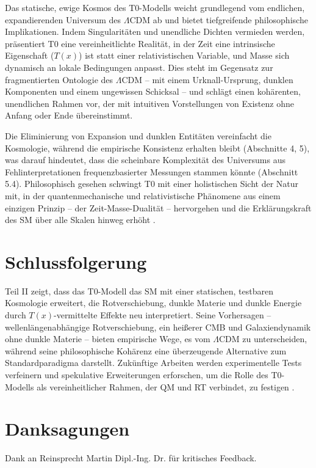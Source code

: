 \documentclass[12pt,a4paper]{article}
\newenvironment{acknowledgments}
{\section*{Danksagungen}}
{\vspace{1em}}
\newcommand{\Tfield}{T(x)}
\begin{document}
	Das statische, ewige Kosmos des T0-Modells weicht grundlegend vom endlichen, expandierenden Universum des \(\Lambda\)CDM ab und bietet tiefgreifende philosophische Implikationen. Indem Singularitäten und unendliche Dichten vermieden werden, präsentiert T0 eine vereinheitlichte Realität, in der Zeit eine intrinsische Eigenschaft (\(\Tfield\)) ist statt einer relativistischen Variable, und Masse sich dynamisch an lokale Bedingungen anpasst. Dies steht im Gegensatz zur fragmentierten Ontologie des \(\Lambda\)CDM – mit einem Urknall-Ursprung, dunklen Komponenten und einem ungewissen Schicksal – und schlägt einen kohärenten, unendlichen Rahmen vor, der mit intuitiven Vorstellungen von Existenz ohne Anfang oder Ende übereinstimmt.
	
	Die Eliminierung von Expansion und dunklen Entitäten vereinfacht die Kosmologie, während die empirische Konsistenz erhalten bleibt (Abschnitte 4, 5), was darauf hindeutet, dass die scheinbare Komplexität des Universums aus Fehlinterpretationen frequenzbasierter Messungen stammen könnte (Abschnitt 5.4). Philosophisch gesehen schwingt T0 mit einer holistischen Sicht der Natur mit, in der quantenmechanische und relativistische Phänomene aus einem einzigen Prinzip – der Zeit-Masse-Dualität – hervorgehen und die Erklärungskraft des SM über alle Skalen hinweg erhöht \cite{pascher_perspective_2025}.
	
	\section{Schlussfolgerung}
	\label{sec:conclusion}
	
	Teil II zeigt, dass das T0-Modell das SM mit einer statischen, testbaren Kosmologie erweitert, die Rotverschiebung, dunkle Materie und dunkle Energie durch \(\Tfield\)-vermittelte Effekte neu interpretiert. Seine Vorhersagen – wellenlängenabhängige Rotverschiebung, ein heißerer CMB und Galaxiendynamik ohne dunkle Materie – bieten empirische Wege, es vom \(\Lambda\)CDM zu unterscheiden, während seine philosophische Kohärenz eine überzeugende Alternative zum Standardparadigma darstellt. Zukünftige Arbeiten werden experimentelle Tests verfeinern und spekulative Erweiterungen erforschen, um die Rolle des T0-Modells als vereinheitlicher Rahmen, der QM und RT verbindet, zu festigen \cite{pascher_perspective_2025}.
	
	\begin{acknowledgments}
		Dank an Reinsprecht Martin Dipl.-Ing. Dr. für kritisches Feedback.
	\end{acknowledgments}
	
\end{document}
